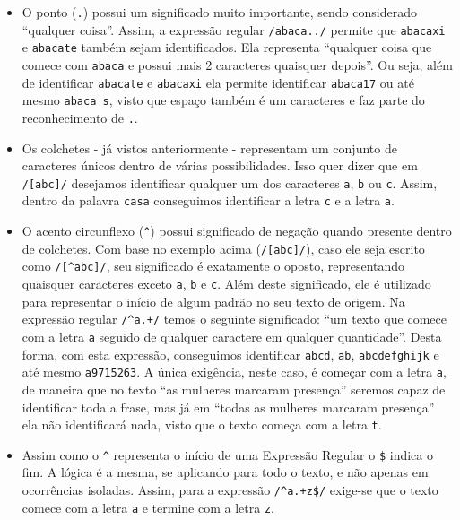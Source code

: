 \begin{itemize}

    \item O ponto (\texttt{.}) possui um significado muito importante, sendo considerado ``qualquer coisa''. Assim, a expressão regular \texttt{/abaca../} permite que \texttt{abacaxi} e \texttt{abacate} também sejam identificados. Ela representa ``qualquer coisa que comece com \texttt{abaca} e possui mais 2 caracteres quaisquer depois''. Ou seja, além de identificar \texttt{abacate} e \texttt{abacaxi} ela permite identificar \texttt{abaca17} ou até mesmo \texttt{abaca s}, visto que espaço também é um caracteres e faz parte do reconhecimento de \texttt{.}.

    \item Os colchetes - já vistos anteriormente - representam um conjunto de caracteres únicos dentro de várias possibilidades. Isso quer dizer que em \texttt{/[abc]/} desejamos identificar qualquer um dos caracteres \texttt{a}, \texttt{b} ou \texttt{c}. Assim, dentro da palavra \texttt{casa} conseguimos identificar a letra \texttt{c} e a letra \texttt{a}.

    \item O acento circunflexo (\texttt{\textasciicircum}) possui significado de negação quando presente dentro de colchetes. Com base no exemplo acima (\texttt{/[abc]/}), caso ele seja escrito como \texttt{/[\textasciicircum{abc}]/}, seu significado é exatamente o oposto, representando quaisquer caracteres exceto \texttt{a}, \texttt{b} e \texttt{c}. Além deste significado, ele é utilizado para representar o início de algum padrão no seu texto de origem. Na expressão regular \texttt{/\textasciicircum{a.+}/} temos o seguinte significado: ``um texto que comece com a letra \texttt{a} seguido de qualquer caractere em qualquer quantidade''. Desta forma, com esta expressão, conseguimos identificar \texttt{abcd}, \texttt{ab}, \texttt{abcdefghijk} e até mesmo \texttt{a9715263}. A única exigência, neste caso, é começar com a letra \texttt{a}, de maneira que no texto ``as mulheres marcaram presença'' seremos capaz de identificar toda a frase, mas já em ``todas as mulheres marcaram presença'' ela não identificará nada, visto que o texto começa com a letra \texttt{t}.

    \item Assim como o \texttt{\textasciicircum} representa o início de uma Expressão Regular o \texttt{\$} indica o fim. A lógica é a mesma, se aplicando para todo o texto, e não apenas em ocorrências isoladas. Assim, para a expressão \texttt{/\textasciicircum{a.+z}\$/} exige-se que o texto comece com a letra \texttt{a} e termine com a letra \texttt{z}.


\end{itemize}
